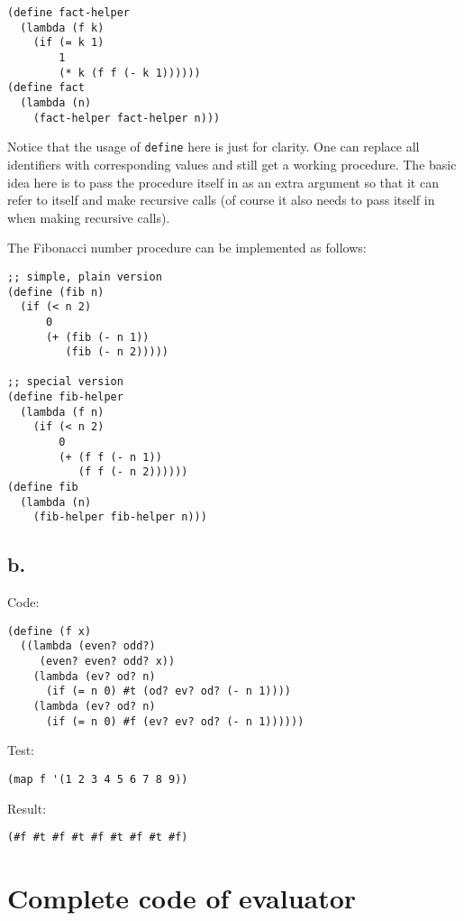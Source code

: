 \documentclass[../main.tex]{subfiles}
\begin{document}
\begin{lstlisting}
(define fact-helper
  (lambda (f k)
    (if (= k 1)
        1
        (* k (f f (- k 1))))))
(define fact
  (lambda (n)
    (fact-helper fact-helper n)))
\end{lstlisting}

Notice that the usage of \lstinline{define} here is just for clarity. One can replace all identifiers with corresponding values and still get a working procedure. The basic idea here is to pass the procedure itself in as an extra argument so that it can refer to itself and make recursive calls (of course it also needs to pass itself in when making recursive calls).

The Fibonacci number procedure can be implemented as follows:

\begin{lstlisting}
;; simple, plain version
(define (fib n)
  (if (< n 2)
      0
      (+ (fib (- n 1))
         (fib (- n 2)))))

;; special version
(define fib-helper
  (lambda (f n)
    (if (< n 2)
        0
        (+ (f f (- n 1))
           (f f (- n 2))))))
(define fib
  (lambda (n)
    (fib-helper fib-helper n)))
\end{lstlisting}

\subsection{b.}

Code:

\begin{lstlisting}
(define (f x)
  ((lambda (even? odd?)
     (even? even? odd? x))
    (lambda (ev? od? n)
      (if (= n 0) #t (od? ev? od? (- n 1))))
    (lambda (ev? od? n)
      (if (= n 0) #f (ev? ev? od? (- n 1))))))
\end{lstlisting}

Test:

\begin{lstlisting}
(map f '(1 2 3 4 5 6 7 8 9))
\end{lstlisting}

Result:

\begin{lstlisting}
(#f #t #f #t #f #t #f #t #f)
\end{lstlisting}

\section*{Complete code of evaluator}
\end{document}
